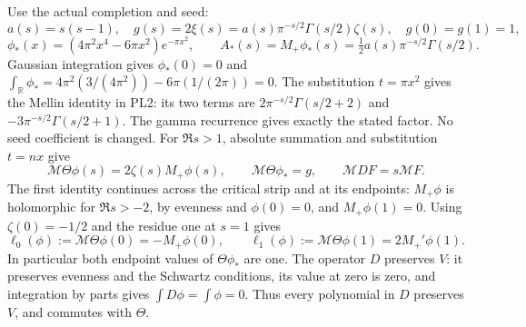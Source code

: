 \documentclass[11pt,a4paper]{article}
\theoremstyle{definition}\newtheorem{definition}[theorem]{Definition}
\begin{document}
Use the actual completion and seed:
\[
 a(s)=s(s-1),\quad
 g(s)=2\xi(s)=a(s)\pi^{-s/2}\Gamma(s/2)\zeta(s),\quad g(0)=g(1)=1,
\]
\[
 \phi_*(x)=(4\pi^2x^4-6\pi x^2)e^{-\pi x^2},\qquad
 A_*(s)=M_+\phi_*(s)=\tfrac12a(s)\pi^{-s/2}\Gamma(s/2).
 \tag{PL2}\label{pl:pl:seed}
\]
Gaussian integration gives \(\phi_*(0)=0\) and
\(\int_{\mathbb R}\phi_*=4\pi^2(3/(4\pi^2))-6\pi(1/(2\pi))=0\).
The substitution \(t=\pi x^2\) gives the Mellin identity in PL2:
its two terms are \(2\pi^{-s/2}\Gamma(s/2+2)\) and
\(-3\pi^{-s/2}\Gamma(s/2+1)\). The gamma recurrence gives exactly
the stated factor. No seed coefficient is changed.
For \(\Re s>1\), absolute summation and substitution \(t=nx\) give
\[
 \mathcal M\Theta\phi(s)=2\zeta(s)M_+\phi(s),\qquad
 \mathcal M\Theta\phi_*=g,\qquad \mathcal M DF=s\mathcal M F.
 \tag{PL3}\label{pl:pl:theta-mellin}
\]
The first identity continues across the critical strip and at its
endpoints: \(M_+\phi\) is holomorphic for \(\Re s>-2\), by evenness
and \(\phi(0)=0\), and \(M_+\phi(1)=0\).
Using \(\zeta(0)=-1/2\) and the residue one at \(s=1\) gives
\[
 \ell_0(\phi):=\mathcal M\Theta\phi(0)=-M_+\phi(0),\qquad
 \ell_1(\phi):=\mathcal M\Theta\phi(1)=2M_+'\phi(1).
 \tag{PL4}\label{pl:pl:logmoments}
\]
In particular both endpoint values of \(\Theta\phi_*\) are one.
The operator \(D\) preserves \(V\): it preserves evenness and the
Schwartz conditions, its value at zero is zero, and integration by
parts gives \(\int D\phi=\int\phi=0\). Thus every polynomial in \(D\)
preserves \(V\), and commutes with \(\Theta\).
\end{document}
